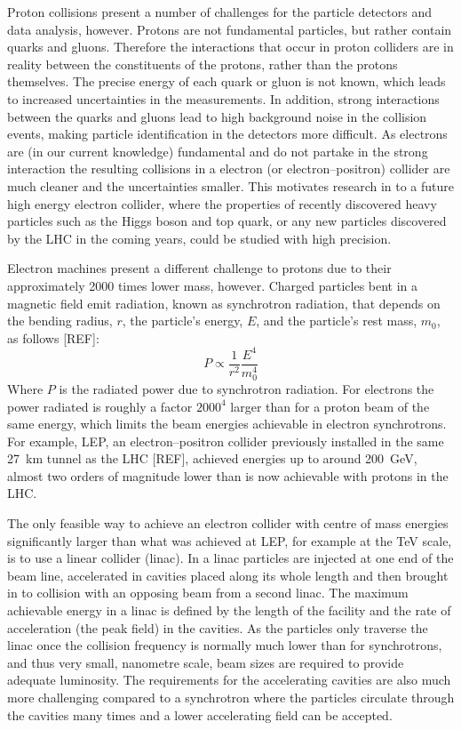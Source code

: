 Proton collisions present a number of challenges for the particle detectors and data analysis, however. Protons are not fundamental particles, but rather contain quarks and gluons. Therefore the interactions that occur in proton colliders are in reality between the constituents of the protons, rather than the protons themselves. The precise energy of each quark or gluon is not known, which leads to increased uncertainties in the measurements. In addition, strong interactions between the quarks and gluons lead to high background noise in the collision events, making particle identification in the detectors more difficult. As electrons are (in our current knowledge) fundamental and do not partake in the strong interaction the resulting collisions in a electron (or electron--positron) collider are much cleaner and the uncertainties smaller. This motivates research in to a future high energy electron collider, where the properties of recently discovered heavy particles such as the Higgs boson and top quark, or any new particles discovered by the LHC in the coming years, could be studied with high precision. 

Electron machines present a different challenge to protons due to their approximately 2000 times lower mass, however. Charged particles bent in a magnetic field emit radiation, known as synchrotron radiation, that depends on the bending radius, \(r\), the particle's energy, \(E\), and the particle's rest mass, \(m_0\), as follows [REF]:
\begin{equation}
P \propto \frac{1}{r^2} \frac{E^4}{m_0^4}
\end{equation}
Where \(P\) is the radiated power due to synchrotron radiation. For electrons the power radiated is roughly a factor \(2000^4\) larger than for a proton beam of the same energy, which limits the beam energies achievable in electron synchrotrons. For example, LEP, an electron--positron collider previously installed in the same 27~km tunnel as the LHC [REF], achieved energies up to around 200~GeV, almost two orders of magnitude lower than is now achievable with protons in the LHC.

The only feasible way to achieve an electron collider with centre of mass energies significantly larger than what was achieved at LEP, for example at the TeV scale, is to use a linear collider (linac). In a linac particles are injected at one end of the beam line, accelerated in cavities placed along its whole length and then brought in to collision with an opposing beam from a second linac. The maximum achievable energy in a linac is defined by the length of the facility and the rate of acceleration (the peak field) in the cavities. As the particles only traverse the linac once the collision frequency is normally much lower than for synchrotrons, and thus very small, nanometre scale, beam sizes are required to provide adequate luminosity. The requirements for the accelerating cavities are also much more challenging compared to a synchrotron where the particles circulate through the cavities many times and a lower accelerating field can be accepted.

